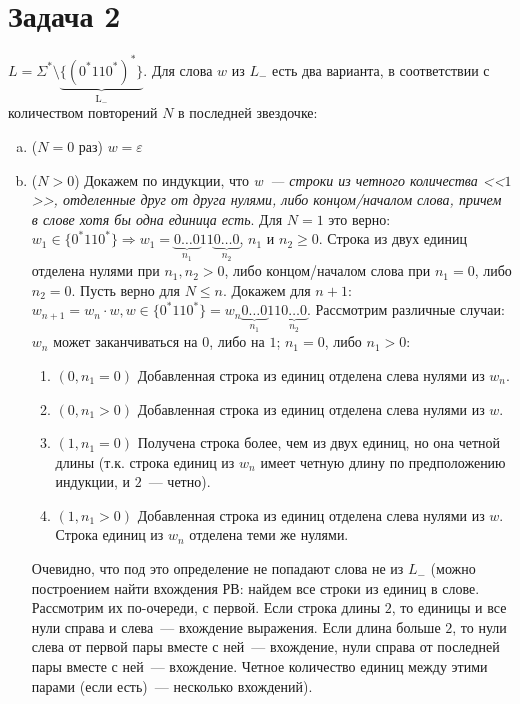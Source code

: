 \documentclass[a4paper]{article}
\begin{document}
\section*{Задача 2}
$L=\Sigma^*\setminus{\underbrace{{\{ (0^*110^*)^* \}}}_\mathrm{{L}_{-}}}$. Для слова $w$ из ${L}_{-}$ есть два варианта, в соответствии с количеством повторений $N$ в последней звездочке:
\begin{enumerate}[a.]
\item ($N=0$ раз) $w=\varepsilon$
\item ($N>0$) Докажем по индукции, что \emph{w~--- строки из четного количества <<$1$>>, отделенные друг от друга нулями, либо концом/началом слова, причем в слове хотя бы одна единица есть}.\newline
Для $N=1$ это верно: $w_1\in \{0^*110^*\}\Rightarrow w_1=\underbrace{0\dots 0}_{n_1}11\underbrace{0\dots 0}_{n_2}$, $n_1$ и $n_2 \geqslant 0$. Строка из двух единиц отделена нулями при $n_1,n_2>0$, либо концом/началом слова при $n_1=0$, либо $n_2=0$.\newline
Пусть верно для $N\leqslant n$. Докажем для $n+1$: $w_{n+1}=w_n\cdot w, w\in \{0^*110^*\}=w_n\underbrace{0\dots 0}_{n_1}11\underbrace{0\dots 0}_{n_2}$. Рассмотрим различные случаи: $w_n$ может заканчиваться на $0$, либо на $1$; $n_1=0$, либо $n_1>0$:
\begin{enumerate}[1.]
\item $(0,n_1=0)$ Добавленная строка из единиц отделена слева нулями из $w_n$.
\item $(0,n_1>0)$ Добавленная строка из единиц отделена слева нулями из $w$.
\item $(1,n_1=0)$ Получена строка более, чем из двух единиц, но она четной длины (т.к. строка единиц из $w_n$ имеет четную длину по предположению индукции, и $2$~--- четно).
\item $(1,n_1>0)$ Добавленная строка из единиц отделена слева нулями из $w$. Строка единиц из $w_n$ отделена теми же нулями.
\end{enumerate}
Очевидно, что под это определение не попадают слова не из $L_-$ (можно построением найти вхождения РВ: найдем все строки из единиц в слове. Рассмотрим их по-очереди, с первой. Если строка длины $2$, то единицы и все нули справа и слева~--- вхождение выражения. Если длина больше $2$, то нули слева от первой пары вместе с ней~--- вхождение, нули справа от последней пары вместе с ней~--- вхождение. Четное количество единиц между этими парами (если есть)~--- несколько вхождений).
\end{enumerate}
\end{document}
